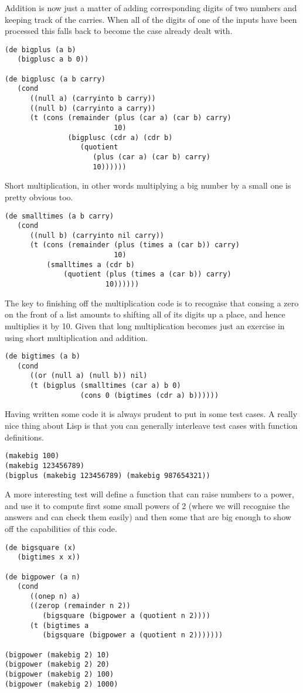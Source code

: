 Addition is now just a matter of adding corresponding digits of two numbers
and keeping track of the carries. When all of the digits of one of the inputs
have been processed this falls back to become the case already dealt with.
{\small\begin{verbatim}
(de bigplus (a b)
   (bigplusc a b 0))

(de bigplusc (a b carry)
   (cond
      ((null a) (carryinto b carry))
      ((null b) (carryinto a carry))
      (t (cons (remainder (plus (car a) (car b) carry)
                          10)
               (bigplusc (cdr a) (cdr b)
                  (quotient
                     (plus (car a) (car b) carry)
                     10))))))
\end{verbatim}}

Short multiplication, in other words multiplying a big number by a small
one is pretty obvious too.
{\small\begin{verbatim}
(de smalltimes (a b carry)
   (cond
      ((null b) (carryinto nil carry))
      (t (cons (remainder (plus (times a (car b)) carry)
                          10)
          (smalltimes a (cdr b)
              (quotient (plus (times a (car b)) carry)
                        10))))))
\end{verbatim}}

The key to finishing off the multiplication code is to recognise that
{\tx cons}ing a zero on the front of a list amounts to shifting all of
its digits up a place, and hence multiplies it by 10. Given that
long multiplication becomes just an exercise in using short multiplication
and addition.
{\small\begin{verbatim}
(de bigtimes (a b)
   (cond
      ((or (null a) (null b)) nil)
      (t (bigplus (smalltimes (car a) b 0)
                  (cons 0 (bigtimes (cdr a) b))))))
\end{verbatim}}

Having written some code it is always prudent to put in some
test cases. A really nice thing about Lisp is that you can generally
interleave test cases with function definitions.
{\small\begin{verbatim}
(makebig 100)
(makebig 123456789)
(bigplus (makebig 123456789) (makebig 987654321))
\end{verbatim}}

A more interesting test will define a function that can raise numbers to
a power, and use it to compute first some small powers of 2 (where we
will recognise the answers and can check them easily) and then some
that are big enough to show off the capabilities of this code.
{\small\begin{verbatim}
(de bigsquare (x)
   (bigtimes x x))

(de bigpower (a n)
   (cond
      ((onep n) a)
      ((zerop (remainder n 2))
         (bigsquare (bigpower a (quotient n 2))))
      (t (bigtimes a
         (bigsquare (bigpower a (quotient n 2)))))))

(bigpower (makebig 2) 10)
(bigpower (makebig 2) 20)
(bigpower (makebig 2) 100)
(bigpower (makebig 2) 1000)
\end{verbatim}}

